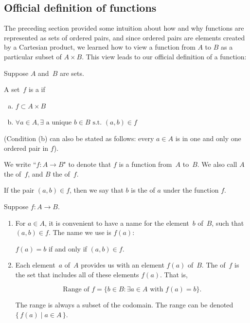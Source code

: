 \subsection{Official definition of functions}

The preceding section provided some intuition about how and why functions are represented as sets of ordered pairs, and since ordered pairs are elements created by a Cartesian product, we learned how to view a function from $A$ to $B$ as a particular subset of $A \times B$.  This view leads to our official definition of a function:

\begin{defn}\label{functionDef}
 Suppose $A$ and~$B$ are sets.

A set~$f$ is a 
 if
\begin{enumerate}[(a)]
\item \label{FunctionDefn-func-pair}
$f \subset A \times B$
\item \label{FunctionDefn-func-unique}
$\forall a \in A, \exists \mbox{ a unique } b \in B \mbox{ s.t. } (a, b) \in f$
\end{enumerate}

\noindent
(Condition (b) can also be stated as follows: every $a \in A$ is in one and only one ordered pair in $f$).  

We write ``$f \colon A \to B$" to denote that $f$ is a function from~$A$ to~$B$.
We also call
$A$  the  of~$f$, and
$B$ the  of~$f$.

If the pair $(a, b) \in f$, then we say that $b$ is the  of $a$ under the function $f$.


\end{defn}

\begin{notation}\label{FunctionNotation} 
 Suppose $f \colon A \to B$. 
\begin{enumerate}
\item For $a \in A$, it is convenient to have a name for the element~$b$ of~$B$, such that $(a,b) \in f$. The name we use is $f(a)$:
\begin{center}
$f(a) = b$ if and only if $(a,b) \in f$.
\end{center}
\item \label{FunctionNotation-range}
 Each element~$a$ of~$A$ provides us with an element $f(a)$ of~$B$. The  of~$f$ is the set that includes all of these elements $f(a)$. That is,

\[ \mbox{Range of }f = \{b \in B : \exists a \in A \mbox{ with } f(a)=b\}.\]

The range is always a subset of the codomain. The range can be denoted $\{\, f(a) \mid a \in A \, \}$.
\end{enumerate}
\end{notation}

